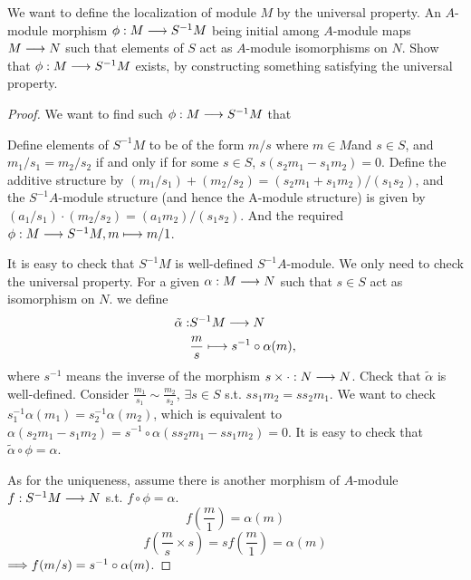 \documentclass[11pt]{book} %
\begin{document}
\begin{exr}
We want to define the localization of module $M$ by the universal property. An $A$-module morphism  $\phi: M\longrightarrow S^{-1}M$ being initial among $A$-module maps $M\longrightarrow N$ such that elements of  $S$ act as $A$-module isomorphisms on $N$.
Show that $\phi:M\longrightarrow S^{-1}M$ exists, by constructing something satisfying the universal property. 
\end{exr}
\begin{proof}
We want to find such $\phi:M\longrightarrow S^{-1}M$ that
\begin{center}
\end{center}
Define elements of $S^{-1}M$ to be of the form $m/s$ where $m\in M$and $s\in S$, and $m_1/s_1 =m_2/s_2$ if and only if for some $s\in S$, $s(s_2m_1 − s_1m_2) = 0$. Define the additive structure by $(m_1/s_1) + (m_2/s_2) = (s_2m_1 + s_1m_2)/(s_1s_2)$, and the $S^{-1}A$-module structure (and hence the A-module structure) is given by$ (a_1/s_1) · (m_2/s_2) = (a_1m_2)/(s_1s_2)$. And the required $\phi:M\longrightarrow S^{-1}M ,m\longmapsto m/1$.

It is easy to check that $S^{-1}M$ is well-defined $S^{-1}A$-module. We only need to check the universal property. For a given $\alpha:M\longrightarrow N$ such that $s\in S$ act as isomorphism on $N$. we define
$$
\begin{aligned}
\tilde{\alpha}:& S^{-1}M\longrightarrow N\\
& \frac{m}{s}\longmapsto s^{-1}\circ\alpha(m),
\end{aligned}
$$
where $s^{-1}$ means the inverse of the morphism $s\times \cdot: N\longrightarrow N$. Check that $\tilde{\alpha}$ is well-defined. Consider $\frac{m_1}{s_1}\sim \frac{m_2}{s_2}$, $\exists s\in S$ s.t. $s s_1m_2=s s_2m_1$. We want to check $s_1^{-1}\alpha(m_1)=s_2^{-1}\alpha(m_2)$, which is equivalent to $\alpha(s_2 m_1-s_1m_2)=s^{-1}\circ \alpha(s s_2m_1-s s_1m_2)=0$.
It is easy to check that $\tilde{\alpha}\circ \phi=\alpha$.

As for the uniqueness, assume there is another morphism of $A$-module $f:S^{-1}M\longrightarrow N$ s.t. $f\circ \phi=\alpha$.
$$
f\left(\frac{m}{1}\right)=\alpha(m)
$$
$$
f\left(\frac{m}{s}\times s\right)=s f\left(\frac{m}{1}\right)=\alpha(m)
$$
$\Longrightarrow f(m/s)=s^{-1}\circ \alpha(m)$.
\end{proof}
\end{document}
